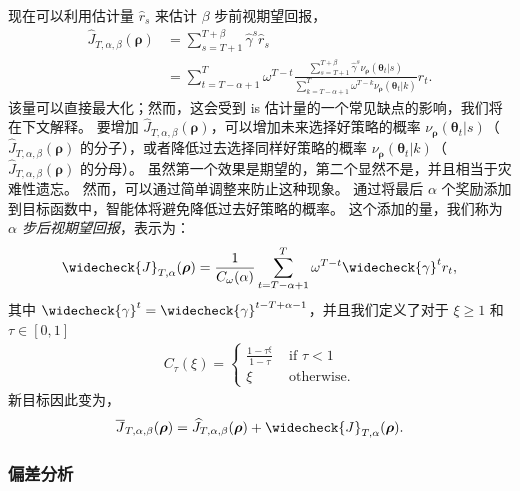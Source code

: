 现在可以利用估计量 $\widehat{r}_{s}$ 来估计 $\beta$ 步前视期望回报，
\begin{align*}
    \widehat{J}_{T,\alpha,\beta}({\boldsymbol\rho}) &= \sum_{s=T+1}^{T+\beta} \widehat{\gamma}^{s} \widehat{r}_{s} \\
    & = \sum_{t=T-\alpha+1}^{T} \omega^{T-t} \frac{\sum_{s=T+1}^{T+\beta} \widehat{\gamma}^s \nu_{\boldsymbol\rho}(\boldsymbol\theta_t\vert s)}{\sum_{k=T-\alpha+1}^T \omega^{T-k} \nu_{\boldsymbol\rho}(\boldsymbol\theta_t\vert k)} r_{t}.
\end{align*}
该量可以直接最大化；然而，这会受到 \gls{is} 估计量的一个常见缺点的影响，我们将在下文解释。
要增加 $\widehat{J}_{T,\alpha,\beta}({\boldsymbol\rho})$，可以增加未来选择好策略的概率 $\nu_{\boldsymbol\rho}(\boldsymbol\theta_t\vert s)$（$\widehat{J}_{T,\alpha,\beta}({\boldsymbol\rho})$ 的分子），或者降低过去选择同样好策略的概率 $\nu_{\boldsymbol\rho}(\boldsymbol\theta_t\vert k)$（$\widehat{J}_{T,\alpha,\beta}({\boldsymbol\rho})$ 的分母）。
虽然第一个效果是期望的，第二个显然不是，并且相当于灾难性遗忘。
然而，可以通过简单调整来防止这种现象。
通过将最后 $\alpha$ 个奖励添加到目标函数中，智能体将避免降低过去好策略的概率。
这个添加的量，我们称为 \emph{$\alpha$ 步后视期望回报}，表示为：
\begin{align*}
    \widecheck{J}_{T,\alpha}({\boldsymbol\rho}) = \frac{1}{C_\omega(\alpha)} \sum_{t=T-\alpha+1}^{T} \omega^{T-t}  \widecheck{\gamma}^t r_{t},
\end{align*}
其中 $\widecheck{\gamma}^t = \widecheck{\gamma}^{t-T+\alpha-1}$，并且我们定义了对于 $\xi \ge 1$ 和 $\tau\in[0,1]$
\begin{align}
\label{eq:def_function_C}
C_\tau(\xi)=\left\{
\begin{array}{cc}
    \frac{1-\tau^\xi}{1-\tau} & \text{ if } \tau<1 \\
    \xi & \text{ otherwise.}
\end{array}\right.
\end{align}
新目标因此变为，
\begin{align}
\label{eq:non_yet_objective}
    \overline{J}_{T,\alpha,\beta}(\boldsymbol\rho) = \widehat{J}_{T,\alpha,\beta}({\boldsymbol\rho})  +  \widecheck{J}_{T,\alpha}({\boldsymbol\rho}).
\end{align}


\subsubsection{偏差分析}
\label{subsec:bias_analysis}

